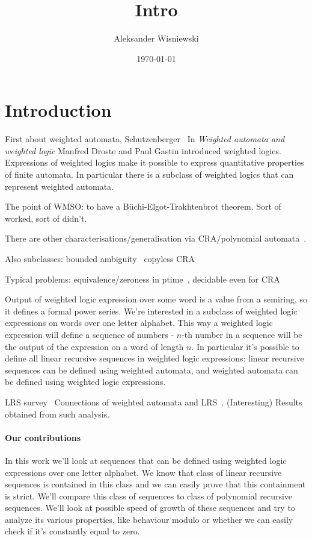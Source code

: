 \documentclass[12pt]{article}
\title{Intro}
\author{Aleksander Wisniewski}
\date{\today}
\theoremstyle{definition}
\begin{document}
\maketitle

\section{Introduction}
First about weighted automata, Schutzenberger~\cite{Schutzenberger61b}
In \textit{Weighted automata and weighted logic} Manfred Droste and Paul Gastin introduced weighted logics.~\cite{DrosteG07,KreutzerR13} Expressions of weighted logics make it possible to express quantitative properties of finite automata. In particular there is a subclass of weighted logics that can represent weighted automata. 

The point of WMSO: to have a Büchi-Elgot-Trakhtenbrot theorem. Sort of worked, sort of didn't.

There are other characterisations/generalisation via CRA/polynomial automata~\cite{Senizergues07,AlurDDRY13,BenediktDSW17}.

Also subclasses: bounded ambiguity~\cite{WeberS91,KreutzerR13} copyless CRA~\cite{AlurDDRY13}

Typical problems: equivalence/zeroness in ptime~\cite{Schutzenberger61b}, decidable even for CRA~\cite{BenediktDSW17}

Output of weighted logic expression over some word is a value from a semiring, so it defines a formal power series. We're interested in a subclass of weighted logic expressions on words over one letter alphabet. This way a weighted logic expression will define a sequence of numbers - $n$-th number in a sequence will be the output of the expression on a word of length $n$. In particular it's possible to define all linear recursive sequences in weighted logic expressions: linear recursive sequences can be defined using weighted automata, and weighted automata can be defined using weighted logic expressions.

LRS survey~\cite{OuaknineW15}
Connections of weighted automata and LRS~\cite{BarloyFLM22,CadilhacMPPS20}. (Interesting) Results obtained from such analysis.

\paragraph*{Our contributions}

In this work we'll look at sequences that can be defined using weighted logic expressions over one letter alphabet. We know that class of linear recursive sequences is contained in this class and we can easily prove that this containment is strict. We'll compare this class of sequences to class of polynomial recursive sequences. We'll look at possible speed of growth of these sequences and try to analyze its various properties, like behaviour modulo or whether we can easily check if it's constantly equal to zero.
\end{document}
